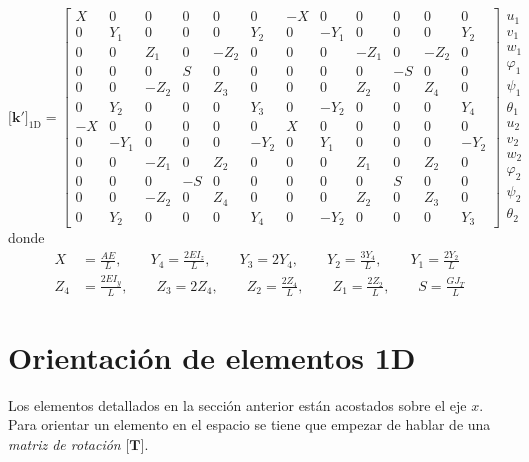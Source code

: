 \documentclass[11pt, a4paper,titlepage]{article}
\newcommand{\Mme}[1]{\boldsymbol{[}\mathbf{#1} \boldsymbol{]}}
\begin{document}
\begin{equation}\label{eq:matrizRigidezTimoshenko} \Mme{k'}_{\mathrm{1D}} = \left[\begin{array}{cccccccccccc} X & 0 & 0 & 0 & 0 & 0 & -X & 0 & 0 & 0 & 0 & 0\\ 0 & Y_{1} & 0 & 0 & 0 & Y_{2} & 0 & -Y_{1} & 0 & 0 & 0 & Y_{2}\\ 0 & 0 & Z_{1} & 0 & -Z_{2} & 0 & 0 & 0 & -Z_{1} & 0 & -Z_{2} & 0\\ 0 & 0 & 0 & S & 0 & 0 & 0 & 0 & 0 & -S & 0 & 0\\ 0 & 0 & -Z_{2} & 0 & Z_{3} & 0 & 0 & 0 & Z_{2} & 0 & Z_{4} & 0\\ 0 & Y_{2} & 0 & 0 & 0 & Y_{3} & 0 & -Y_{2} & 0 & 0 & 0 & Y_{4}\\ -X & 0 & 0 & 0 & 0 & 0 & X & 0 & 0 & 0 & 0 & 0\\ 0 & -Y_{1} & 0 & 0 & 0 & -Y_{2} & 0 & Y_{1} & 0 & 0 & 0 & -Y_{2}\\ 0 & 0 & -Z_{1} & 0 & Z_{2} & 0 & 0 & 0 & Z_{1} & 0 & Z_{2} & 0\\ 0 & 0 & 0 & -S & 0 & 0 & 0 & 0 & 0 & S & 0 & 0\\ 0 & 0 & -Z_{2} & 0 & Z_{4} & 0 & 0 & 0 & Z_{2} & 0 & Z_{3} & 0\\ 0 & Y_{2} & 0 & 0 & 0 & Y_{4} & 0 & -Y_{2} & 0 & 0 & 0 & Y_{3} \end{array}\right]\begin{array}{c}
u_1\\
v_1 \\
w_1 \\
\varphi_1 \\
\psi_1 \\
\theta_1 \\
u_2\\
v_2 \\
w_2 \\
\varphi_2 \\
\psi_2 \\
\theta_2 
\end{array}
\end{equation} 
donde  
\begin{align*}
	X&=\frac{AE}{L}, \qquad Y_4 = \frac{2EI_z}{L}, \qquad Y_3 = 2Y_4, \qquad Y_2 = \frac{3Y_4}{L} ,\qquad Y_1 = \frac{2Y_2}{L} \\
	Z_4 &= \frac{2EI_y}{L}, \qquad Z_3=2Z_4, \qquad Z_2 = \frac{2Z_4}{L}, \qquad Z_1 = \frac{2Z_2}{L}, \qquad S = \frac{G J_T}{L}
\end{align*}

\section{Orientación de elementos 1D} \label{sec:OrientacionElementos}
Los elementos detallados en la sección anterior están acostados sobre el eje $x$. Para orientar un elemento en el espacio se tiene que empezar de hablar de una \textit{matriz de rotación} $\Mme{T}$.
\end{document}
